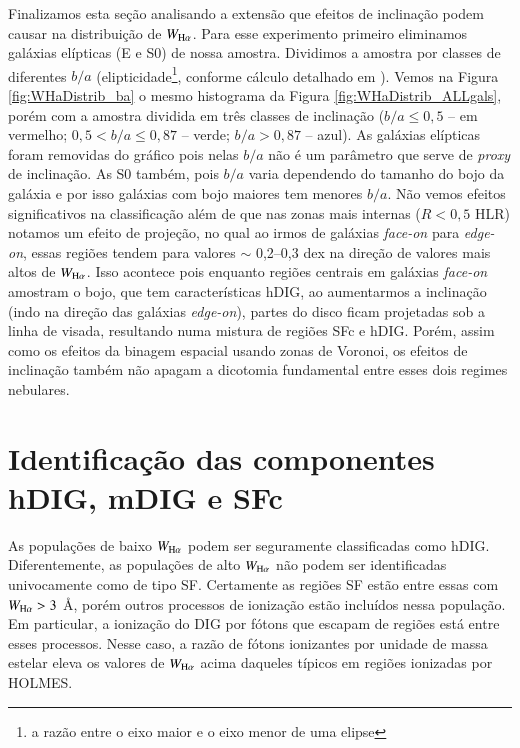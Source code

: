Finalizamos esta seção analisando a extensão que efeitos de inclinação podem causar na distribuição de $W_{\Ha}$. Para esse experimento primeiro eliminamos galáxias elípticas (E e S0) de nossa amostra. Dividimos a amostra por classes de diferentes $b/a$ (elipticidade\footnote{a razão entre o eixo maior e o eixo menor de uma elipse}, conforme cálculo detalhado em \citealt{deAmorim.etal.2017}). Vemos na Figura \ref{fig:WHaDistrib_ba} o mesmo histograma da Figura \ref{fig:WHaDistrib_ALLgals}, porém com a amostra dividida em três classes de inclinação ($b/a \le 0,5$ -- em vermelho; $0,5 < b/a \le 0,87$ -- verde; $b/a > 0,87$ -- azul). As galáxias elípticas foram removidas do gráfico pois nelas $b/a$ não é um parâmetro que serve de {\em proxy} de inclinação. As S0 também, pois $b/a$ varia dependendo do tamanho do bojo da galáxia e por isso galáxias com bojo maiores tem menores $b/a$. Não vemos efeitos significativos na classificação além de que nas zonas mais internas ($R < 0,5$ HLR) notamos um efeito de projeção, no qual ao irmos de galáxias {\em face-on} para {\em edge-on}, essas regiões tendem para valores $\sim$ 0,2--0,3 dex na direção de valores mais altos de $W_{\Ha}$. Isso acontece pois enquanto regiões centrais em galáxias {\em face-on} amostram o bojo, que tem características hDIG, ao aumentarmos a inclinação (indo na direção das galáxias {\em edge-on}), partes do disco ficam projetadas sob a linha de visada, resultando numa mistura de regiões SFc e hDIG. Porém, assim como os efeitos da binagem espacial usando zonas de Voronoi, os efeitos de inclinação também não apagam a dicotomia fundamental entre esses dois regimes nebulares.

\section{Identificação das componentes hDIG, mDIG e SFc}
\label{sec:DIGclass:identclass}

As populações de baixo $W_{\Ha}$ podem ser seguramente classificadas como hDIG. Diferentemente, as populações de alto $W_{\Ha}$ não podem ser identificadas univocamente como de tipo SF. Certamente as regiões SF estão entre essas com $W_{\Ha} > 3$ \AA, porém outros processos de ionização estão incluídos nessa população. Em particular, a ionização do DIG por fótons que escapam de regiões \hii está entre esses processos. Nesse caso, a razão de fótons ionizantes por unidade de massa estelar eleva os valores de $W_{\Ha}$ acima daqueles típicos em regiões ionizadas por HOLMES.


